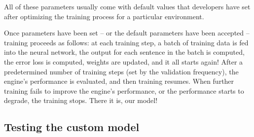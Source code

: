 \documentclass[output=paper]{langscibook}
\begin{document}
All of these parameters usually come with default values that developers have set after optimizing the training process for a particular environment. 

Once parameters have been set -- or the default parameters have been accepted -- training proceeds as follows: at each training step, a batch of training data is fed into the neural network, the output for each sentence in the batch is computed, the error loss is computed, weights are updated, and it all starts again! After a predetermined number of training steps (set by the validation frequency), the engine's performance is evaluated, and then training resumes. When further training fails to improve the engine's performance, or the performance starts to degrade, the training stops. There it is, our model!
  

\subsection{Testing the custom model}
\end{document}
